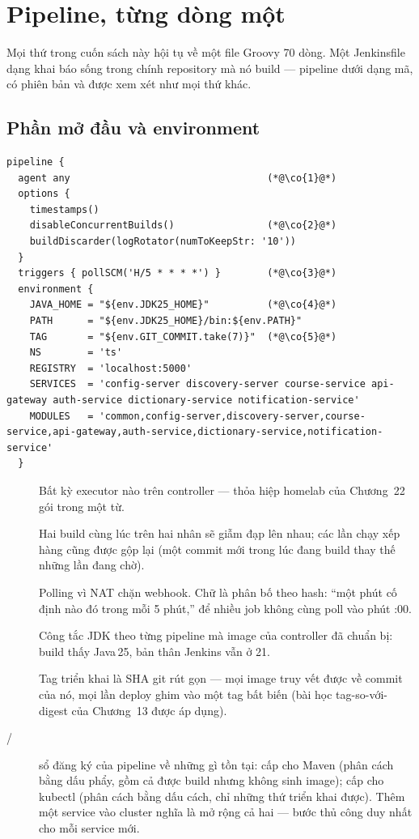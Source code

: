\chapter{Pipeline, từng dòng một}
\label{ch:pipeline}

Mọi thứ trong cuốn sách này hội tụ về một file Groovy 70 dòng. Một
Jenkinsfile dạng khai báo sống trong chính repository mà nó build ---
pipeline dưới dạng mã, có phiên bản và được xem xét như mọi thứ khác.

\section{Phần mở đầu và environment}

\begin{lstlisting}
pipeline {
  agent any                                  (*@\co{1}@*)
  options {
    timestamps()
    disableConcurrentBuilds()                (*@\co{2}@*)
    buildDiscarder(logRotator(numToKeepStr: '10'))
  }
  triggers { pollSCM('H/5 * * * *') }        (*@\co{3}@*)
  environment {
    JAVA_HOME = "${env.JDK25_HOME}"          (*@\co{4}@*)
    PATH      = "${env.JDK25_HOME}/bin:${env.PATH}"
    TAG       = "${env.GIT_COMMIT.take(7)}"  (*@\co{5}@*)
    NS        = 'ts'
    REGISTRY  = 'localhost:5000'
    SERVICES  = 'config-server discovery-server course-service api-gateway auth-service dictionary-service notification-service'
    MODULES   = 'common,config-server,discovery-server,course-service,api-gateway,auth-service,dictionary-service,notification-service'
  }
\end{lstlisting}

\begin{description}
  \item[] Bất kỳ executor nào trên controller --- thỏa hiệp
  homelab của Chương~22 gói trong một từ.
  \item[] Hai build cùng lúc trên hai nhân sẽ giẫm đạp lên
  nhau; các lần chạy xếp hàng cũng được gộp lại (một commit mới trong
  lúc đang build thay thế những lần đang chờ).
  \item[] Polling vì NAT chặn webhook. Chữ  là phân bố
  theo hash: ``một phút cố định nào đó trong mỗi 5 phút,'' để nhiều
  job không cùng poll vào phút :00.
  \item[] Công tắc JDK theo từng pipeline mà image của
  controller đã chuẩn bị: build thấy Java\,25, bản thân Jenkins vẫn ở
  21.
  \item[] Tag triển khai là SHA git rút gọn --- mọi image truy
  vết được về commit của nó, mọi lần deploy ghim vào một tag bất biến
  (bài học tag-so-với-digest của Chương~13 được áp dụng).
  \item[/] sổ đăng ký của pipeline về
  những gì tồn tại:  cấp cho Maven (phân cách bằng dấu
  phẩy, gồm cả  được build nhưng không sinh image);
   cấp cho kubectl (phân cách bằng dấu cách, chỉ những
  thứ triển khai được). Thêm một service vào cluster nghĩa là mở rộng
  cả hai --- bước thủ công duy nhất cho mỗi service mới.
\end{description}

